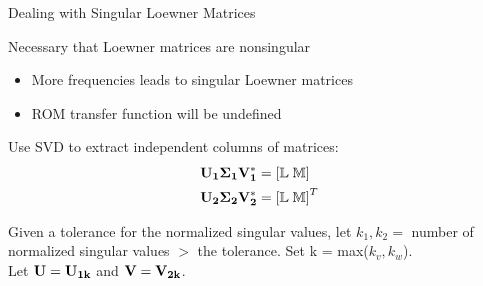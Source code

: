 \begin{frame}{Dealing with Singular Loewner Matrices}

Necessary that Loewner matrices are nonsingular\\

\bigskip

\begin{itemize}
    \item More frequencies leads to singular Loewner matrices
    \item ROM transfer function will be undefined 
\end{itemize}

\bigskip
Use SVD to extract independent columns of matrices:
\\
\begin{align*}
\bf U_1 \Sigma_1 V_1^* &= \left[ \mathbb{L} \; \mathbb{M} \right] \\
\bf U_2 \Sigma_2 V_2^* &= \left[ \mathbb{L} \; \mathbb{M} \right]^T 
\end{align*}

Given a tolerance for the normalized singular values, let \(k_1, k_2 =\) number of normalized singular values \(>\) the tolerance. Set k = max(\(k_v, k_w\)).\\
\bigskip
Let $\bf U = U_{1k}$ and $\bf V = V_{2k}$.
\end{frame}


